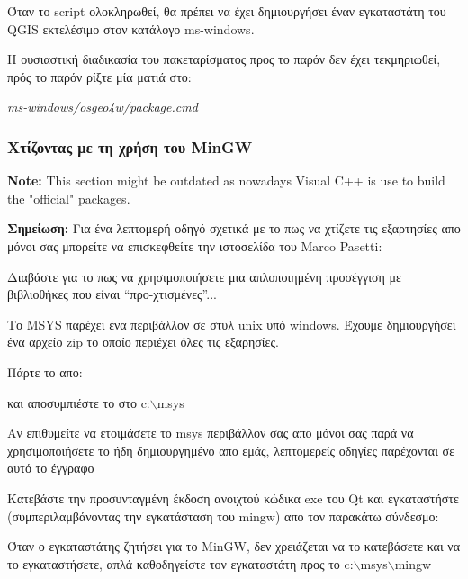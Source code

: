 Όταν το script ολοκληρωθεί, θα πρέπει να έχει δημιουργήσει έναν εγκαταστάτη του QGIS εκτελέσιμο στον κατάλογο ms-windows.

Η ουσιαστική διαδικασία του πακεταρίσματος προς το παρόν δεν έχει τεκμηριωθεί, πρός το παρόν ρίξτε μία ματιά στο:

\textit{ms-windows/osgeo4w/package.cmd}

\hypertarget{toc16}{}
\subsubsection{Χτίζοντας με τη χρήση του MinGW}
\textbf{Note:} This section might be outdated as nowadays Visual C++ is use to build
the "official" packages.

\textbf{Σημείωση:} Για ένα λεπτομερή οδηγό σχετικά με το πως να χτίζετε τις εξαρτησίες απο μόνοι σας μπορείτε να επισκεφθείτε την ιστοσελίδα του Marco Pasetti:


Διαβάστε για το πως να χρησιμοποιήσετε μια απλοποιημένη προσέγγιση με βιβλιοθήκες που είναι “προ-χτισμένες”...

Το MSYS παρέχει ένα περιβάλλον σε στυλ unix υπό windows. Έχουμε δημιουργήσει ένα αρχείο zip το οποίο περιέχει όλες τις εξαρησίες. 

Πάρτε το απο: 


και αποσυμπιέστε το στο c:$\backslash$msys

Αν επιθυμείτε να ετοιμάσετε το msys περιβάλλον σας απο μόνοι σας παρά να χρησιμοποιήσετε το ήδη δημιουργημένο απο εμάς, λεπτομερείς οδηγίες παρέχονται σε αυτό το έγγραφο

Κατεβάστε την προσυνταγμένη έκδοση ανοιχτού κώδικα exe του Qt και εγκαταστήστε (συμπεριλαμβάνοντας την εγκατάσταση του mingw) απο τον παρακάτω σύνδεσμο:


Όταν ο εγκαταστάτης ζητήσει για το MinGW, δεν χρειάζεται να το κατεβάσετε και να το εγκαταστήσετε, απλά καθοδηγείστε τον εγκαταστάτη προς το c:$\backslash$msys$\backslash$mingw

